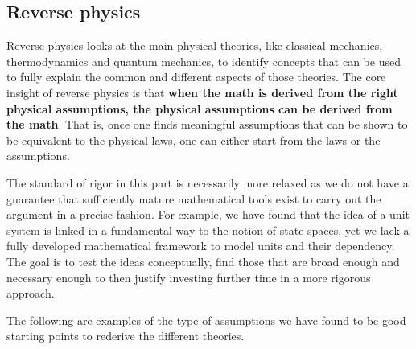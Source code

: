 \documentclass[11pt,letterpaper,fleqn]{memoir} %
\begin{document}
\subsection{Reverse physics}

Reverse physics looks at the main physical theories, like classical mechanics, thermodynamics and quantum mechanics, to identify concepts that can be used to fully explain the common and different aspects of those theories. The core insight of reverse physics is that \textbf{when the math is derived from the right physical assumptions, the physical assumptions can be derived from the math}. That is, once one finds meaningful assumptions that can be shown to be equivalent to the physical laws, one can either start from the laws or the assumptions.

The standard of rigor in this part is necessarily more relaxed as we do not have a guarantee that sufficiently mature mathematical tools exist to carry out the argument in a precise fashion. For example, we have found that the idea of a unit system is linked in a fundamental way to the notion of state spaces, yet we lack a fully developed mathematical framework to model units and their dependency. The goal is to test the ideas conceptually, find those that are broad enough and necessary enough to then justify investing further time in a more rigorous approach.

The following are examples of the type of assumptions we have found to be good starting points to rederive the different theories.
\end{document}
